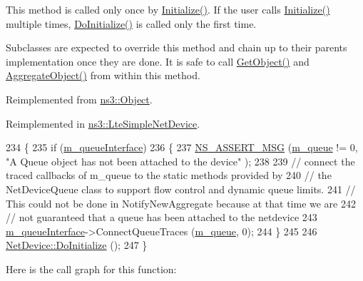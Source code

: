 This method is called only once by \hyperlink{classns3_1_1Object_af4411cb29971772fcd09203474a95078}{Initialize()}. If the user calls \hyperlink{classns3_1_1Object_af4411cb29971772fcd09203474a95078}{Initialize()} multiple times, \hyperlink{classns3_1_1SimpleNetDevice_ab8f09c559877b0568e793755b176a83c}{Do\+Initialize()} is called only the first time.

Subclasses are expected to override this method and chain up to their parent\textquotesingle{}s implementation once they are done. It is safe to call \hyperlink{classns3_1_1Object_a13e18c00017096c8381eb651d5bd0783}{Get\+Object()} and \hyperlink{classns3_1_1Object_a79dd435d300f3deca814553f561a2922}{Aggregate\+Object()} from within this method. 

Reimplemented from \hyperlink{classns3_1_1Object_af8482a521433409fb5c7f749398c9dbe}{ns3\+::\+Object}.



Reimplemented in \hyperlink{classns3_1_1LteSimpleNetDevice_a284ce8bd7312c98107e4cf584c4fd8b1}{ns3\+::\+Lte\+Simple\+Net\+Device}.


\begin{DoxyCode}
234 \{
235   \textcolor{keywordflow}{if} (\hyperlink{classns3_1_1SimpleNetDevice_a35bd6983512fe87988362fa02f6425e7}{m\_queueInterface})
236     \{
237       \hyperlink{assert_8h_aff5ece9066c74e681e74999856f08539}{NS\_ASSERT\_MSG} (\hyperlink{classns3_1_1SimpleNetDevice_a72e1e606223c7e4683f64259d14ef065}{m\_queue} != 0, \textcolor{stringliteral}{"A Queue object has not been attached to the device"}
      );
238 
239       \textcolor{comment}{// connect the traced callbacks of m\_queue to the static methods provided by}
240       \textcolor{comment}{// the NetDeviceQueue class to support flow control and dynamic queue limits.}
241       \textcolor{comment}{// This could not be done in NotifyNewAggregate because at that time we are}
242       \textcolor{comment}{// not guaranteed that a queue has been attached to the netdevice}
243       \hyperlink{classns3_1_1SimpleNetDevice_a35bd6983512fe87988362fa02f6425e7}{m\_queueInterface}->ConnectQueueTraces (\hyperlink{classns3_1_1SimpleNetDevice_a72e1e606223c7e4683f64259d14ef065}{m\_queue}, 0);
244     \}
245 
246   \hyperlink{classns3_1_1Object_af8482a521433409fb5c7f749398c9dbe}{NetDevice::DoInitialize} ();
247 \}
\end{DoxyCode}


Here is the call graph for this function\+:


